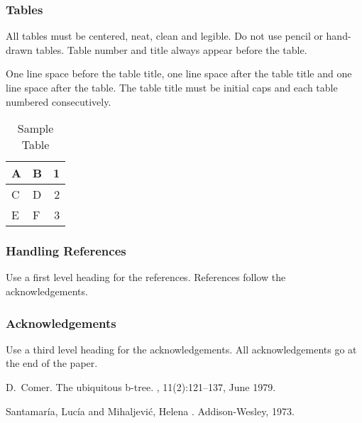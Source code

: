 \documentclass[a4paper]{article}
\begin{document}
\subsubsection{Tables}

All tables must be centered, neat, clean and legible. Do not use pencil
or hand-drawn tables. Table number and title always appear before the
table.

One line space before the table title, one line space after the table
title and one line space after the table. The table title must be
initial caps and each table numbered consecutively.

\begin{table}[ht]
\begin{center}
\caption{Sample Table}

\bigskip

\begin{tabular}{|l|l|r|}
\hline
A & B & 1\\ \hline
C & D & 2\\
E & F & 3\\ \hline
\end{tabular}
\end{center}
\end{table}


\subsubsection{Handling References}

Use a first level heading for the references. References follow the
acknowledgements.


\subsubsection{Acknowledgements}

Use a third level heading for the acknowledgements. All acknowledgements
go at the end of the paper.




% 
%

\begin{thebibliography}
  
D.~Comer.
\newblock The ubiquitous b-tree.
, 11(2):121--137, June 1979.

Santamaría, Lucía and Mihaljević, Helena
.
\newblock Addison-Wesley, 1973.

\end{thebibliography}
\end{document}
